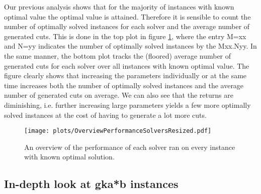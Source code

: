 \documentclass[12pt,a4paper]{article}
\theoremstyle{mythm}
\begin{document}
Our previous analysis shows that for the majority of instances with known optimal value the optimal value is attained.
Therefore it is sensible to count the number of optimally solved instances for each solver and the average number of generated cuts.
This is done in the top plot in figure \ref{plot:PerformanceSolversKnownInstances}, where the entry M=xx  and N=yy indicates the number of optimally solved instances by
the \BH Mxx.Nyy.
In the same manner, the bottom plot tracks the (floored) average number of generated cuts for each solver over all instances with known optimal value.
The figure clearly shows that increasing the parameters individually or at the same time increases both the number of optimally solved instances and the average number of
generated cuts on average.
We can also see that the returns are diminishing, i.e. further increasing large parameters yields a few more optimally solved instances at the cost of having to generate a lot more
cuts.

\begin{figure}
\texttt{[image: plots/OverviewPerformanceSolversResized.pdf]}
\caption{An overview of the performance of each solver ran on every instance with known optimal solution.}
\label{plot:PerformanceSolversKnownInstances} 
\end{figure} 

\subsection{In-depth look at gka*b instances} 
\label{ssec:gkaib} 
\end{document}
